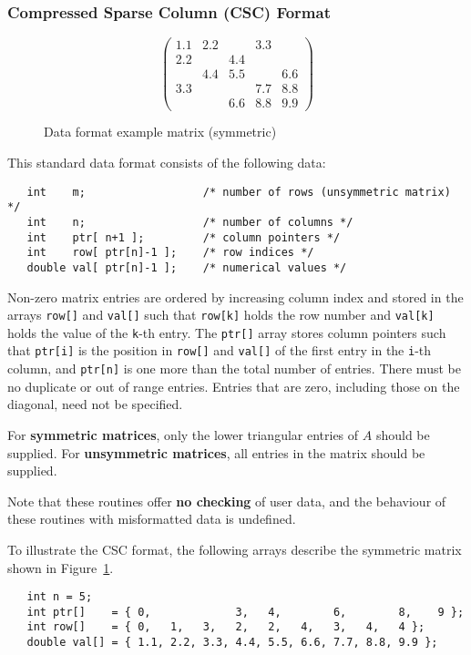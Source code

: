 \subsubsection{Compressed Sparse Column (CSC) Format} \label{cscformat}

\begin{figure}
   \caption{ \label{format eg}
      Data format example matrix (symmetric)
   }
   $$
      \left( \begin{array}{ccccc}
         1.1 & 2.2 &     & 3.3 &     \\
         2.2 &     & 4.4 &     &     \\
             & 4.4 & 5.5 &     & 6.6 \\
         3.3 &     &     & 7.7 & 8.8 \\
             &     & 6.6 & 8.8 & 9.9
      \end{array} \right)
   $$
\end{figure}

This standard data format consists of the following data:
\begin{verbatim}
   int    m;                  /* number of rows (unsymmetric matrix) */
   int    n;                  /* number of columns */
   int    ptr[ n+1 ];         /* column pointers */
   int    row[ ptr[n]-1 ];    /* row indices */
   double val[ ptr[n]-1 ];    /* numerical values */
\end{verbatim}
Non-zero matrix entries are ordered by increasing column index and stored in
the arrays \texttt{row[]} and \texttt{val[]} such that \texttt{row[k]} holds
the row number and \texttt{val[k]} holds the value of the \texttt{k}-th entry.
The \texttt{ptr[]} array stores column pointers such that \texttt{ptr[i]} is
the position in \texttt{row[]} and \texttt{val[]} of
the first entry in the \texttt{i}-th column, and \texttt{ptr[n]} is one more
than the total number of entries. There must be no duplicate or out of range
entries.
Entries that are zero, including those on the diagonal, need not be specified.

For \textbf{symmetric matrices}, only the lower triangular entries of $A$
should be supplied. For \textbf{unsymmetric matrices}, all entries in the matrix
should be supplied.

Note that these routines offer \textbf{no checking} of user data, and the
behaviour of these routines with misformatted data is undefined.

To illustrate the CSC format, the following arrays describe the symmetric
matrix shown in Figure~\ref{format eg}.
\begin{verbatim}
   int n = 5;
   int ptr[]    = { 0,             3,   4,        6,        8,    9 };
   int row[]    = { 0,   1,   3,   2,   2,   4,   3,   4,   4 };
   double val[] = { 1.1, 2.2, 3.3, 4.4, 5.5, 6.6, 7.7, 8.8, 9.9 };
\end{verbatim}

